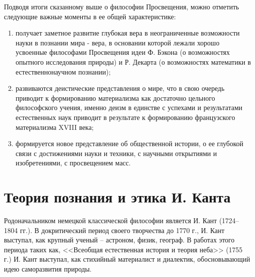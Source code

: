 \documentclass[12pt,a4paper]{article}
\begin{document}
	Подводя итоги сказанному выше о философии Просвещения, можно отметить следующие важные моменты в ее общей характеристике:
	
	\begin{enumerate}
		\item получает заметное развитие глубокая вера в неограниченные возможности науки в познании мира - вера, в основании которой лежали хорошо усвоенные философами Просвещения идеи Ф. Бэкона (о возможностях опытного исследования природы) и Р. Декарта (о возможностях математики в естественнонаучном познании);
		
		\item развиваются деистические представления о мире, что в свою очередь приводит к формированию материализма как достаточно цельного философского учения, именно деизм в единстве с успехами и результатами естественных наук приводит в результате к формированию французского материализма XVIII века;
		
		\item формируется новое представление об общественной истории, о ее глубокой связи с достижениями науки и техники, с научными открытиями и изобретениями, с просвещением масс.
	\end{enumerate}
	
	\section{Теория познания и этика И. Канта~\checkmark}
	Родоначальником немецкой классической философии является И. Кант (1724–1804 гг.). В докритический период своего творчества до 1770 г., И. Кант выступал, как крупный ученый – астроном, физик, географ. В работах этого периода таких как, <<Всеобщая естественная история и теория неба>> (1755 г.) И. Кант выступал, как стихийный материалист и диалектик, обосновывающий идею саморазвития природы.
	
\end{document}
